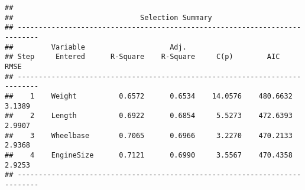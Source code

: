 \documentclass[
]{book}
\begin{document}
\begin{verbatim}
## 
##                              Selection Summary                              
## ---------------------------------------------------------------------------
##         Variable                    Adj.                                       
## Step     Entered      R-Square    R-Square     C(p)        AIC        RMSE     
## ---------------------------------------------------------------------------
##    1    Weight          0.6572      0.6534    14.0576    480.6632    3.1389    
##    2    Length          0.6922      0.6854     5.5273    472.6393    2.9907    
##    3    Wheelbase       0.7065      0.6966     3.2270    470.2133    2.9368    
##    4    EngineSize      0.7121      0.6990     3.5567    470.4358    2.9253    
## ---------------------------------------------------------------------------
\end{verbatim}

  
\end{document}
